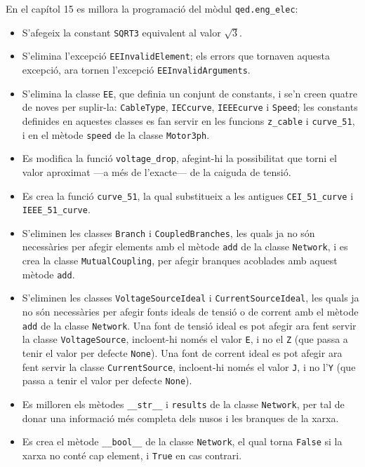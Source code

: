 En el capítol 15 es millora la programació del mòdul  \texttt{qed.eng\_elec}:
\begin{itemize}
	\item S'afegeix la constant \texttt{SQRT3} equivalent al valor $\sqrt{3}$.
	\item S'elimina l'excepció \texttt{EEInvalidElement}; els errors que tornaven aquesta excepció, ara tornen l'excepció \texttt{EEInvalidArguments}. 
	\item S'elimina la classe \texttt{EE}, que definia un conjunt de constants, i se'n creen quatre de noves per suplir-la: \texttt{CableType}, \texttt{IECcurve}, \texttt{IEEEcurve} i \texttt{Speed}; les constants definides en aquestes classes es fan servir en les funcions \texttt{z\_cable} i \texttt{curve\_51}, i en el mètode \texttt{speed} de la classe \texttt{Motor3ph}.
	\item Es modifica la funció \texttt{voltage\_drop}, afegint-hi la possibilitat que torni el valor aproximat ---a més de l'exacte--- de la caiguda de tensió.
	\item Es crea la funció \texttt{curve\_51}, la qual substitueix a les antigues \texttt{CEI\_51\_curve} i \texttt{IEEE\_51\_curve}.
	\item S'eliminen les classes \texttt{Branch} i \texttt{CoupledBranches}, les quals ja no són necessàries per afegir elements amb el mètode \texttt{add} de la classe \texttt{Network}, i es crea la  classe \texttt{MutualCoupling}, per afegir branques acoblades amb aquest mètode \texttt{add}. 
	\item S'eliminen les classes \texttt{VoltageSourceIdeal} i \texttt{CurrentSourceIdeal}, les quals ja no són necessàries per afegir fonts ideals de tensió o de corrent amb el mètode \texttt{add} de la classe \texttt{Network}. Una font de tensió ideal es pot afegir ara fent servir la classe \texttt{VoltageSource}, incloent-hi només el valor \texttt{E}, i no el \texttt{Z} (que passa a tenir el valor per defecte \texttt{None}). Una font de corrent ideal es pot afegir ara fent servir la classe \texttt{CurrentSource}, incloent-hi només el valor \texttt{J}, i no l'\texttt{Y} (que passa a tenir el valor per defecte \texttt{None}).
	\item Es milloren els mètodes \texttt{\_\_str\_\_} i \texttt{results} de la classe \texttt{Network}, per tal de donar una informació més completa dels nusos i les branques de la xarxa.
	\item Es crea el mètode \texttt{\_\_bool\_\_} de la classe \texttt{Network}, el qual torna \texttt{False} si la xarxa no conté cap element, i \texttt{True} en cas contrari.

\end{itemize}
